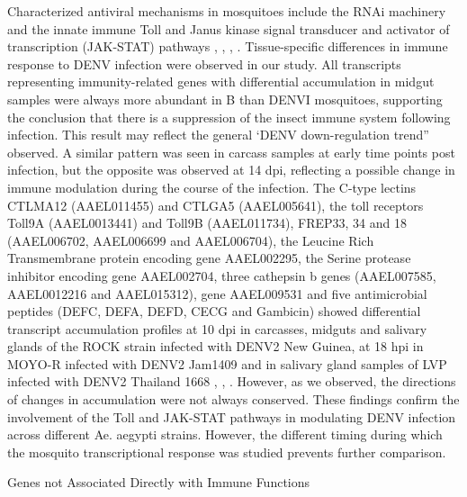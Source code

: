 Characterized antiviral mechanisms in mosquitoes include the RNAi machinery and the innate immune Toll and Janus kinase signal transducer and activator of transcription (JAK-STAT) pathways \cite{Xi2008}, \cite{Sanchez-Vargas2009}, \cite{Behura2011}, \cite{Souza-Neto2009}.
Tissue-specific differences in immune response to DENV infection were observed in our study.
All transcripts representing immunity-related genes with differential accumulation in midgut samples were always more abundant in B than DENVI mosquitoes, supporting the conclusion that there is a suppression of the insect immune system following infection.
This result may reflect the general ‘DENV down-regulation trend” observed.
A similar pattern was seen in carcass samples at early time points post infection, but the opposite was observed at 14 dpi, reflecting a possible change in immune modulation during the course of the infection.
The C-type lectins CTLMA12 (AAEL011455) and CTLGA5 (AAEL005641), the toll receptors Toll9A (AAEL0013441) and Toll9B (AAEL011734), FREP33, 34 and 18 (AAEL006702, AAEL006699 and AAEL006704), the Leucine Rich Transmembrane protein encoding gene AAEL002295, the Serine protease inhibitor encoding gene AAEL002704, three cathepsin b genes (AAEL007585, AAEL0012216 and AAEL015312), gene AAEL009531 and five antimicrobial peptides (DEFC, DEFA, DEFD, CECG and Gambicin) showed differential transcript accumulation profiles at 10 dpi in carcasses, midguts and salivary glands of the ROCK strain infected with DENV2 New Guinea, at 18 hpi in MOYO-R infected with DENV2 Jam1409 and in salivary gland samples of LVP infected with DENV2 Thailand 1668 \cite{Xi2008}, \cite{Luplertlop2011}, \cite{Behura2011}.
However, as we observed, the directions of changes in accumulation were not always conserved.
These findings confirm the involvement of the Toll and JAK-STAT pathways in modulating DENV infection across different Ae. aegypti strains.
However, the different timing during which the mosquito transcriptional response was studied prevents further comparison.

Genes not Associated Directly with Immune Functions

